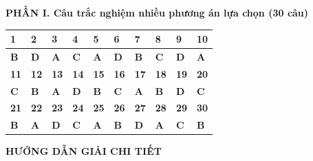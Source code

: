 \documentclass[12pt,a4paper]{article}
\begin{document}
\noindent\textbf{PHẦN I. Câu trắc nghiệm nhiều phương án lựa chọn (30 câu)}
\vspace{1.5pt}
\begin{center}
\renewcommand{\arraystretch}{1.15}
\begin{tabular}{|C{0.95cm}|C{0.95cm}|C{0.95cm}|C{0.95cm}|C{0.95cm}|C{0.95cm}|C{0.95cm}|C{0.95cm}|C{0.95cm}|C{0.95cm}|}
\hline
\textbf{1} & \textbf{2} & \textbf{3} & \textbf{4} & \textbf{5} & \textbf{6} & \textbf{7} & \textbf{8} & \textbf{9} & \textbf{10} \\ \hline
\textbf{B} & \textbf{D} & \textbf{A} & \textbf{C} & \textbf{A} & \textbf{D} & \textbf{B} & \textbf{C} & \textbf{D} & \textbf{A} \\ \hline
\hline
\textbf{11} & \textbf{12} & \textbf{13} & \textbf{14} & \textbf{15} & \textbf{16} & \textbf{17} & \textbf{18} & \textbf{19} & \textbf{20} \\ \hline
\textbf{C} & \textbf{B} & \textbf{A} & \textbf{D} & \textbf{B} & \textbf{C} & \textbf{A} & \textbf{B} & \textbf{D} & \textbf{C} \\ \hline
\hline
\textbf{21} & \textbf{22} & \textbf{23} & \textbf{24} & \textbf{25} & \textbf{26} & \textbf{27} & \textbf{28} & \textbf{29} & \textbf{30} \\ \hline
\textbf{B} & \textbf{A} & \textbf{D} & \textbf{C} & \textbf{A} & \textbf{B} & \textbf{D} & \textbf{A} & \textbf{C} & \textbf{B} \\ \hline
\end{tabular}
\end{center}

\vspace{4pt}
\begin{center}
  {\large\bfseries\color{ink} HƯỚNG DẪN GIẢI CHI TIẾT}
\end{center}
\vspace{1pt}
\end{document}
